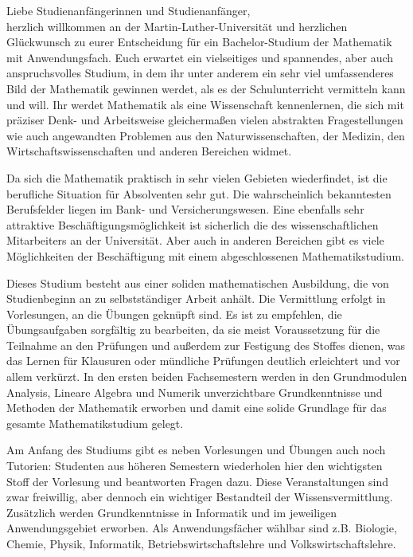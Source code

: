 Liebe Studienanfängerinnen und Studienanfänger,\\
herzlich willkommen an der Martin-Luther-Universität und herzlichen Glückwunsch zu eurer Entscheidung für ein Bachelor-Studium der Mathematik mit Anwendungsfach.
Euch erwartet ein vielseitiges und spannendes, aber auch anspruchsvolles Studium, in dem ihr unter anderem ein sehr viel umfassenderes Bild der Mathematik gewinnen werdet, als es der Schulunterricht vermitteln kann und will.
Ihr werdet Mathematik als eine Wissenschaft kennenlernen, die sich mit präziser Denk- und Arbeitsweise gleichermaßen vielen abstrakten Fragestellungen wie auch angewandten Problemen aus den Naturwissenschaften, der Medizin, den Wirtschaftswissenschaften und anderen Bereichen widmet.

Da sich die Mathematik praktisch in sehr vielen Gebieten wiederfindet, ist die berufliche Situation für Absolventen sehr gut.
Die wahrscheinlich bekanntesten Berufsfelder liegen im Bank- und Versicherungswesen.
Eine ebenfalls sehr attraktive Beschäftigungsmöglichkeit ist sicherlich die des wissenschaftlichen Mitarbeiters an der Universität.
Aber auch in anderen Bereichen gibt es viele Möglichkeiten der Beschäftigung mit einem abgeschlossenen Mathematikstudium.

Dieses Studium besteht aus einer soliden mathematischen Ausbildung, die von Studienbeginn an zu selbstständiger Arbeit anhält.
Die Vermittlung erfolgt in Vorlesungen, an die Übungen geknüpft sind.
Es ist zu empfehlen, die Übungsaufgaben sorgfältig zu bearbeiten, da sie meist Voraussetzung für die Teilnahme an den Prüfungen und außerdem zur Festigung des Stoffes dienen, was das Lernen für Klausuren oder mündliche Prüfungen deutlich erleichtert und vor allem verkürzt.
In den ersten beiden Fachsemestern werden in den Grundmodulen Analysis, Lineare Algebra und Numerik unverzichtbare Grundkenntnisse und Methoden der Mathematik erworben und damit eine solide Grundlage für das gesamte Mathematikstudium gelegt.

Am Anfang des Studiums gibt es neben Vorlesungen und Übungen auch noch Tutorien:
Studenten aus höheren Semestern wiederholen hier den wichtigsten Stoff der Vorlesung und beantworten Fragen dazu.
Diese Veranstaltungen sind zwar freiwillig, aber dennoch ein wichtiger Bestandteil der Wissensvermittlung.
Zusätzlich werden Grundkenntnisse in Informatik und im jeweiligen Anwendungsgebiet erworben.
Als Anwendungsfächer wählbar sind z.B. Biologie, Chemie, Physik, Informatik, Betriebswirtschaftslehre und Volkswirtschaftslehre.

